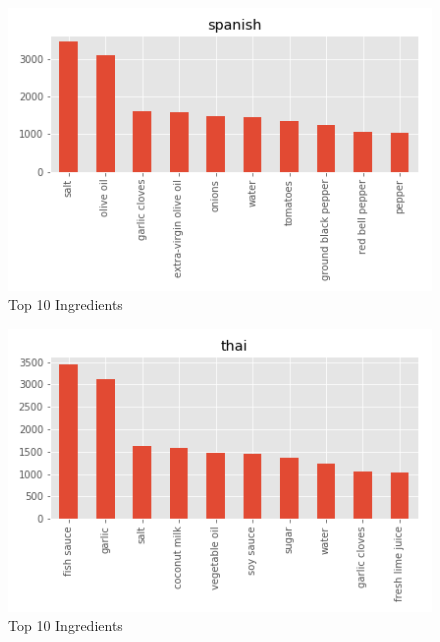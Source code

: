 \documentclass[sigconf]{acmart}
\begin{document}
\begin{figure}[!ht]
  \centering\includegraphics[width=\columnwidth]{images/spanish_10_most_used_ingredients.png}
  \caption{Top 10 Ingredients }\label{f:spanish_10_most_used_ingredients}
\end{figure}

\begin{figure}[!ht]
  \centering\includegraphics[width=\columnwidth]{images/thai_10_most_used_ingredients.png}
  \caption{Top 10 Ingredients }\label{f:thai_10_most_used_ingredients}
\end{figure}
\end{document}

